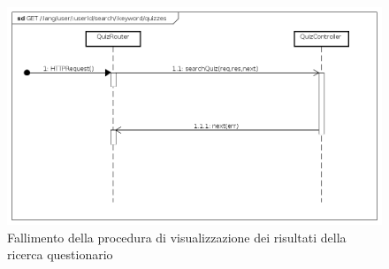 \begin{itemize}
\begin{figure}[ht]
	\centering
	\includegraphics[scale=0.45]{UML/DiagrammiDiSequenza/Back-end/GET__lang_user__userId_search__keyword_quizzes_failure.png}
	\caption{Fallimento della procedura di visualizzazione dei risultati della ricerca questionario}
\end{figure}
\FloatBarrier
\end{itemize}






